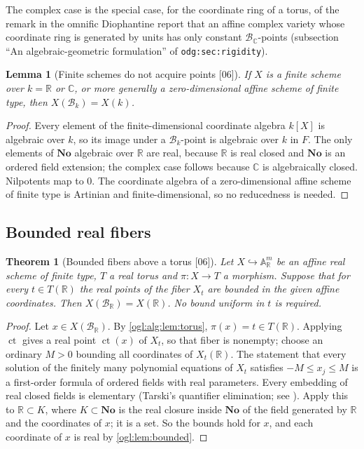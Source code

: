 \documentclass[11pt,oneside]{article}
\numberwithin{equation}{section}
\newtheorem{theorem}{Theorem}[section]
\newtheorem{lemma}[lemma]{Lemma}
\theoremstyle{definition}
\theoremstyle{remark}
\newcommand{\No}{\mathbf{No}}
\newcommand{\R}{\mathbb R}
\newcommand{\C}{\mathbb C}
\newcommand{\Bk}{\mathcal B_k}
\newcommand{\BR}{\mathcal B_{\R}}
\newcommand{\BC}{\mathcal B_{\C}}
\newcommand{\ct}{\operatorname{ct}}
\newcommand{\src}[1]{\textup{\textsf{\small[#1]}}}
\newcommand{\replabel}[1]{\nolinkurl{#1}}
\begin{document}
The complex case is the special case, for the coordinate ring of a torus, of
the remark in the omnific Diophantine report that an affine complex variety
whose coordinate ring is generated by units has only constant $\BC$-points
(subsection ``An algebraic-geometric formulation'' of
\replabel{odg:sec:rigidity}).

\begin{lemma}[Finite schemes do not acquire points \src{06}]\label{ogl:alg:lem:finite}
If $X$ is a finite scheme over $k=\R$ or $\C$, or more generally a
zero-dimensional affine scheme of finite type, then $X(\Bk)=X(k)$.
\end{lemma}
\begin{proof}
Every element of the finite-dimensional coordinate algebra $k[X]$ is algebraic
over $k$, so its image under a $\Bk$-point is algebraic over $k$ in $F$. The
only elements of $\No$ algebraic over $\R$ are real, because $\R$ is real
closed and $\No$ is an ordered field extension; the complex case follows
because $\C$ is algebraically closed. Nilpotents map to $0$. The coordinate
algebra of a zero-dimensional affine scheme of finite type is Artinian and
finite-dimensional, so no reducedness is needed.
\end{proof}

\subsection{Bounded real fibers}

\begin{theorem}[Bounded fibers above a torus \src{06}]\label{ogl:alg:thm:fibers}
Let $X\hookrightarrow\mathbb A_\R^m$ be an affine real scheme of finite type,
$T$ a real torus and $\pi:X\to T$ a morphism. Suppose that for every
$t\in T(\R)$ the real points of the fiber $X_t$ are bounded in the given affine
coordinates. Then $X(\BR)=X(\R)$. No bound uniform in $t$ is required.
\end{theorem}
\begin{proof}
Let $x\in X(\BR)$. By \cref{ogl:alg:lem:torus}, $\pi(x)=t\in T(\R)$. Applying
$\ct$ gives a real point $\ct(x)$ of $X_t$, so that fiber is nonempty; choose
an ordinary $M>0$ bounding all coordinates of $X_t(\R)$. The statement that
every solution of the finitely many polynomial equations of $X_t$ satisfies
$-M\le x_j\le M$ is a first-order formula of ordered fields with real
parameters. Every embedding of real closed fields is elementary (Tarski's
quantifier elimination; see \cite{Marker}). Apply this to $\R\subset K$, where
$K\subset\No$ is the real closure inside $\No$ of the field generated by $\R$
and the coordinates of $x$; it is a set. So the bounds hold for $x$, and each
coordinate of $x$ is real by \cref{ogl:lem:bounded}.
\end{proof}
\end{document}
